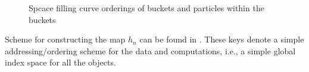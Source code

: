 \documentclass[conference,compsoc]{IEEEtran}
\begin{document}
\begin{figure}[!t]
\centering
{}
\label{fig:SFC_particles_buckets}
\hfil
{}
\label{fig:SFC_particles_buckets_partition}
\caption{Spcace filling curve orderings of buckets and particles within the buckets}
\label{fig:SFC_domain_decomposition}
\end{figure}
Scheme for constructing the map $h_n$ can be found in \cite{patra1995problem}. These keys denote a simple addressing/ordering scheme for the data and computations, i.e., a simple global index space for all the objects.\\
\end{document}
